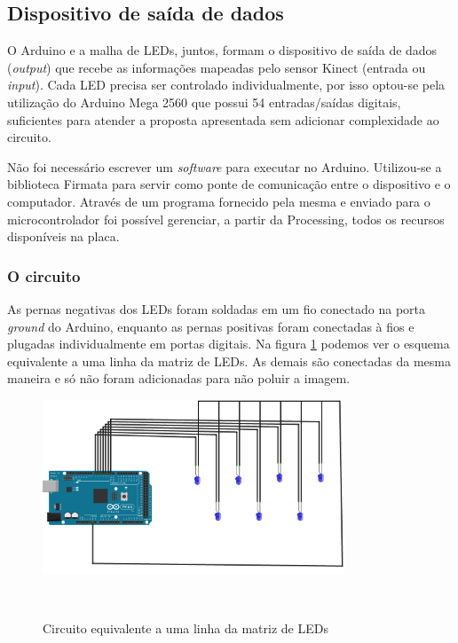 \subsection{\textbf{Dispositivo de saída de dados}}

O Arduino e a malha de LEDs, juntos, formam o dispositivo de saída de dados (\textit{output}) que recebe as informações mapeadas pelo sensor Kinect (entrada ou \textit{input}). Cada LED precisa ser controlado individualmente, por isso optou-se pela utilização do Arduino Mega 2560 que possui 54 entradas/saídas digitais, suficientes para atender a proposta apresentada sem adicionar complexidade ao circuito.


Não foi necessário escrever um \textit{software} para executar no Arduino. Utilizou-se a biblioteca Firmata para servir como ponte de comunicação entre o dispositivo e o computador. Através de um programa fornecido pela mesma e enviado para o microcontrolador foi possível gerenciar, a partir da Processing, todos os recursos disponíveis na placa.

\subsubsection{O circuito}

As pernas negativas dos LEDs foram soldadas em um fio conectado na porta \textit{ground} do Arduino, enquanto as pernas positivas foram conectadas à fios e plugadas individualmente em portas digitais. Na figura \ref{fig:breadboard} podemos ver o esquema equivalente a uma linha da matriz de LEDs. As demais são conectadas da mesma maneira e só não foram adicionadas para não poluir a imagem.

\begin{figure}[H]
  \begin{center}
    \caption{Circuito equivalente a uma linha da matriz de LEDs}
    \vspace*{0,2cm}
    \includegraphics[width=0.8\textwidth]{./04-figuras/breadboard}
    \label{fig:breadboard}
  \end{center}
  \vspace*{-0,9cm}
  \\
\end{figure}

